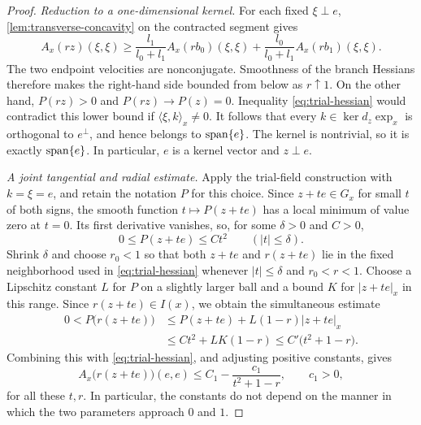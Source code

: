 \begin{proof}
\medskip\noindent
\emph{Reduction to a one-dimensional kernel.}
For each fixed $\xi\perp e$, \cref{lem:transverse-concavity} on the
contracted segment gives
\[
 A_x(rz)(\xi,\xi)
 \geq \frac{l_1}{l_0+l_1}A_x(rb_0)(\xi,\xi)
     +\frac{l_0}{l_0+l_1}A_x(rb_1)(\xi,\xi).
\]
The two endpoint velocities are nonconjugate.  Smoothness of the
branch Hessians therefore makes the right-hand side bounded from
below as $r\uparrow1$.  On the other hand, $P(rz)>0$ and
$P(rz)\to P(z)=0$.  Inequality \eqref{eq:trial-hessian} would
contradict this lower bound if $\langle\xi,k\rangle_x\ne0$.
It follows that every $k\in\ker d_z\exp_x$ is orthogonal to
$e^\perp$, and hence belongs to $\operatorname{span}\{e\}$.
The kernel is nontrivial, so it is exactly $\operatorname{span}\{e\}$.
In particular, $e$ is a kernel vector and $z\perp e$.

\medskip\noindent
\emph{A joint tangential and radial estimate.}
Apply the trial-field construction with $k=\xi=e$, and retain the
notation $P$ for this choice.  Since $z+te\in G_x$ for small
$t$ of both signs, the smooth function $t\mapsto P(z+te)$ has a
local minimum of value zero at $t=0$.  Its first derivative vanishes,
so, for some $\delta>0$ and $C>0$,
\[
 0\leq P(z+te)\leq Ct^2\qquad(|t|\leq\delta).
\]
Shrink $\delta$ and choose $r_0<1$ so that both $z+te$ and
$r(z+te)$ lie in the fixed neighborhood used in
\eqref{eq:trial-hessian} whenever $|t|\leq\delta$ and
$r_0<r<1$.  Choose a Lipschitz constant $L$ for $P$ on a slightly
larger ball and a bound $K$ for $|z+te|_x$ in this range.
Since $r(z+te)\in I(x)$, we obtain the simultaneous estimate
\begin{equation}
 \begin{split}
 0<P\bigl(r(z+te)\bigr)
 &\leq P(z+te)+L(1-r)|z+te|_x\\
 &\leq Ct^2+LK(1-r)
 \leq C'\bigl(t^2+1-r\bigr).
 \end{split}
 \label{eq:quadratic-index}
\end{equation}
Combining this with \eqref{eq:trial-hessian}, and adjusting positive
constants, gives
\begin{equation}
 A_x\bigl(r(z+te)\bigr)(e,e)
 \leq C_1-\frac{c_1}{t^2+1-r},\qquad c_1>0,
 \label{eq:singular-upper}
\end{equation}
for all these $t,r$.  In particular, the constants do not depend
on the manner in which the two parameters approach $0$ and $1$.


\end{proof}
